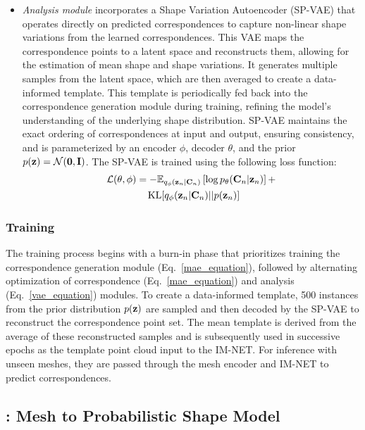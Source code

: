 \begin{itemize}
    \item \textit{Analysis module} incorporates a Shape Variation Autoencoder (SP-VAE) that operates directly on predicted correspondences to capture non-linear shape variations from the learned correspondences. This VAE \cite{kingma2019introduction} maps the correspondence points to a latent space and reconstructs them, allowing for the estimation of mean shape and shape variations. It generates multiple samples from the latent space, which are then averaged to create a data-informed template. This template is periodically fed back into the correspondence generation module during training, refining the model's understanding of the underlying shape distribution. SP-VAE maintains the exact ordering of correspondences at input and output, ensuring consistency, and is parameterized by an encoder \(\phi\), decoder \(\theta\), and the prior \(p(\mathbf{z}) = \mathcal{N} (\mathbf{0}, \mathbf{I})\). The SP-VAE is trained using the following loss function:
    \begin{equation}\label{vae_equation}
    \begin{aligned}
    \mathcal{L(\theta,\phi)} &= -\mathbb{E}_{q_{\phi} (\mathbf{z}_n|\mathbf{C}_n)} \left[\operatorname{log} p_\theta(\mathbf{C}_n|\mathbf{z}_n)\right] + \\
    &\quad \operatorname{KL}[q_{\phi}(\mathbf{z}_n|\mathbf{C}_n) || p(\mathbf{z}_n)]      
    \end{aligned}
    \end{equation}
\end{itemize}
\subsubsection{Training}
The training process begins with a burn-in phase that prioritizes training the correspondence generation module (Eq.~\ref{mae_equation}), followed by alternating optimization of correspondence (Eq.~\ref{mae_equation}) and analysis (Eq.~\ref{vae_equation}) modules. To create a data-informed template, 500 instances from the prior distribution \(p(\mathbf{z})\) are sampled and then decoded by the SP-VAE to reconstruct the correspondence point set. The mean template is derived from the average of these reconstructed samples and is subsequently used in successive epochs as the template point cloud input to the IM-NET. For inference with unseen meshes, they are passed through the mesh encoder and IM-NET to predict correspondences.


\subsection{\model: Mesh to Probabilistic Shape Model}\label{mesh2ssm_plus}

